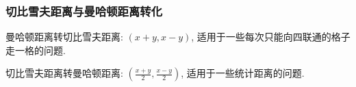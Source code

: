 \subsubsection{切比雪夫距离与曼哈顿距离转化}
曼哈顿距离转切比雪夫距离: $(x+y,x-y)$, 适用于一些每次只能向四联通的格子走一格的问题.

切比雪夫距离转曼哈顿距离: $(\frac{x+y}{2}, \frac{x-y}{2})$, 适用于一些统计距离的问题.